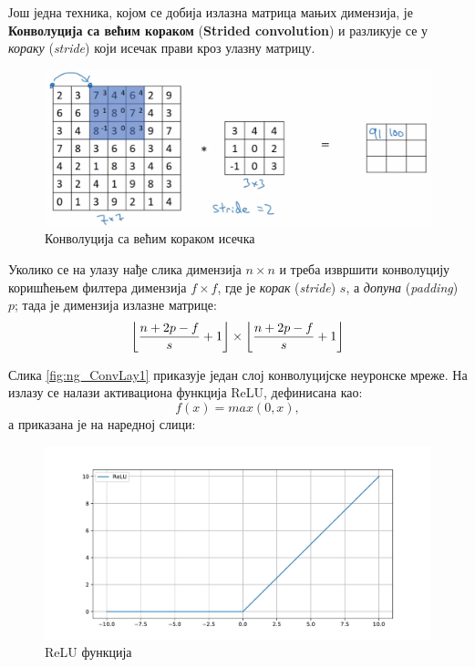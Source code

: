 \documentclass[12pt, а4paper]{article}
\DeclarePairedDelimiter\floor{\lfloor}{\rfloor}
\begin{document}
Још једна техника, којом се добија излазна матрица мањих димензија, је
\textbf{Конволуција са већим кораком} (\textbf{Strided convolution}) и
разликује се у \textit{кораку} (\textit{stride}) који исечак прави
кроз улазну матрицу.

\begin{figure}[H]
  \centering
      \includegraphics[scale=0.35]{slike/ngConvStride1.png}
  \caption{Конволуција са већим кораком исечка}
  \label{fig:ng_ConvStride1}
\end{figure}

Уколико се на улазу нађе слика димензија $n \times n$ и треба
извршити конволуцију коришћењем филтера димензија $f \times f$, где је
\textit{корак} (\textit{stride}) $s$, а \textit{допуна} (\textit{padding}) $p$;
тада је димензија излазне матрице:
\begin{equation*}
 \floor*{\frac{n+2p-f}{s}+1} \times \floor*{\frac{n+2p-f}{s}+1}
\end{equation*}

Слика \ref{fig:ng_ConvLay1} приказује један слој конволуцијске неуронске
мреже. На излазу се налази активациона функција ReLU, дефинисана као:
\begin{equation}
f(x) = max(0,x),
\end{equation}
а приказана је на наредној слици:

\begin{figure}[H]
  \centering
      \includegraphics[scale=0.35]{slike/ReLU.pdf}
  \caption{ReLU функција}
  \label{fig:ReLU}
\end{figure}
\end{document}
